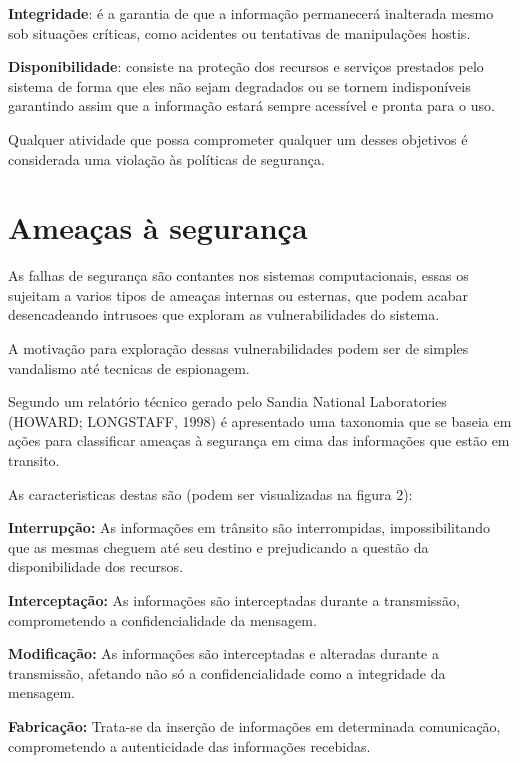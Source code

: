 \documentclass[
	12pt,				%
	openright,			%
	oneside,
	a4paper,			%
	english,			%
	french,				%
	spanish,			%
	brazil				%
	]{abntex2}
\begin{document}
\textbf{Integridade}: é a garantia de que a informação permanecerá inalterada mesmo sob situações críticas, como acidentes ou tentativas de manipulações hostis.

\textbf{Disponibilidade}: consiste na proteção dos recursos e serviços prestados pelo sistema de forma que eles não sejam degradados ou se tornem indisponíveis garantindo assim que a informação estará sempre acessível e pronta para o uso.



Qualquer atividade que possa comprometer qualquer um desses
objetivos é considerada uma violação às políticas de segurança.

 \section{Ameaças à segurança}

 As falhas de segurança são contantes nos sistemas computacionais, essas os sujeitam a varios tipos de ameaças internas ou esternas, que podem acabar desencadeando intrusoes que exploram as vulnerabilidades do sistema.  

 A motivação para exploração dessas vulnerabilidades podem ser de simples vandalismo até tecnicas de espionagem.

Segundo um relatório técnico gerado pelo Sandia National Laboratories (HOWARD; LONGSTAFF, 1998) é apresentado uma taxonomia que se baseia em ações para classificar ameaças à segurança em cima das informações que estão em transito. 

As caracteristicas destas são (podem ser visualizadas na figura 2):

\textbf{Interrupção:} As informações em trânsito são interrompidas, impossibilitando que as mesmas cheguem até seu destino e prejudicando a questão da disponibilidade dos recursos.

\textbf{Interceptação:} As informações são interceptadas durante a transmissão, comprometendo a confidencialidade da mensagem.

\textbf{Modificação:} As informações são interceptadas e alteradas 
durante a transmissão, afetando não só a confidencialidade como a integridade da mensagem.

\textbf{Fabricação:} Trata-se da inserção de informações em determinada comunicação, comprometendo a autenticidade das informações recebidas.
\end{document}
